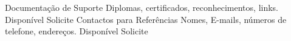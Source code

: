 


\begin{cvhonors}


\cvhonor
{Documentação de Suporte}
{Diplomas, certificados, reconhecimentos, links.}
{Disponível}
{Solicite}
\cvhonor
{Contactos para Referências}
{Nomes, E-mails, números de telefone, endereços.}
{Disponível}
{Solicite}



\end{cvhonors}
